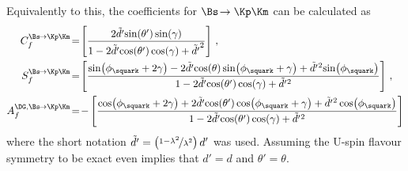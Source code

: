 Equivalently to this, the \CP coefficients for $\Bs\!\to\Kp\Km$ can be calculated as
\begin{equation}
\begin{aligned}
C_{f}^{\Bs\!\to\Kp\Km}&\!=\!\left[\frac{2\tilde{d'}\!\sin\!\left(\theta'\right)\sin\!\left(\gamma\right)}{1-2\tilde{d'}\!\cos\!\left(\theta'\right)\cos\!\left(\gamma\right)+\tilde{d'}^2}\right]\,,\\
S_{f}^{\Bs\!\to\Kp\Km}&\!=\!\left[\frac{\sin\!\left(\phi_\squark+2\gamma\right)-2\tilde{d'}\!\cos\!\left(\theta\right)\sin\!\left(\phi_\squark+\gamma\right)+\tilde{d'}{}^2\!\sin\!\left(\phi_\squark\right)}{1-2\tilde{d'}\!\cos\!\left(\theta'\right)\cos\!\left(\gamma\right)+\tilde{d'}{}^2}\right]\,,\\
A_f^{\DG, \Bs\!\to\Kp\Km}&\!=\!-\left[\frac{\cos\!\left(\phi_\squark+2\gamma\right)+2\tilde{d'}\!\cos\!\left(\theta'\right)\cos\!\left(\phi_\squark+\gamma\right)+\tilde{d'}{}^2\cos\!\left(\phi_\squark\right)}{1-2\tilde{d'}\!\cos\!\left(\theta'\right)\cos\!\left(\gamma\right)+\tilde{d'}{}^2}\right]
\end{aligned}
\end{equation}
where the short notation $\tilde{d'}=\left(\nicefrac{1-\lambda^2}{\lambda^2}\right)d'$ was used.
Assuming the U-spin flavour symmetry to be exact even implies that $d'=d$ and $\theta'=\theta$.

